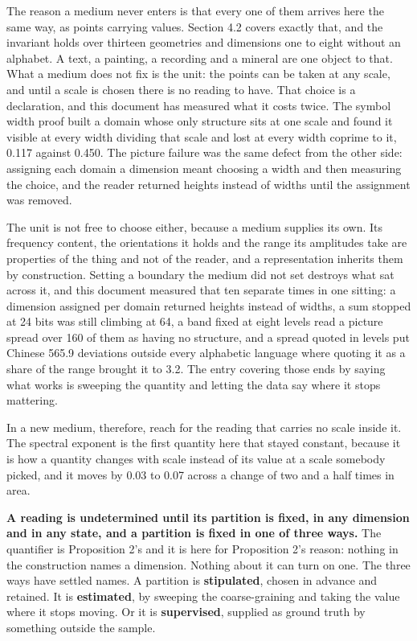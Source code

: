 The reason a medium never enters is that every one of them arrives here the same way, as points carrying values. Section 4.2 covers exactly that, and the invariant holds over thirteen geometries and dimensions one to eight without an alphabet. A text, a painting, a recording and a mineral are one object to that. What a medium does not fix is the unit: the points can be taken at any scale, and until a scale is chosen there is no reading to have. That choice is a declaration, and this document has measured what it costs twice. The symbol width proof built a domain whose only structure sits at one scale and found it visible at every width dividing that scale and lost at every width coprime to it, 0.117 against 0.450. The picture failure was the same defect from the other side: assigning each domain a dimension meant choosing a width and then measuring the choice, and the reader returned heights instead of widths until the assignment was removed.

The unit is not free to choose either, because a medium supplies its own. Its frequency content, the orientations it holds and the range its amplitudes take are properties of the thing and not of the reader, and a representation inherits them by construction. Setting a boundary the medium did not set destroys what sat across it, and this document measured that ten separate times in one sitting: a dimension assigned per domain returned heights instead of widths, a sum stopped at 24 bits was still climbing at 64, a band fixed at eight levels read a picture spread over 160 of them as having no structure, and a spread quoted in levels put Chinese 565.9 deviations outside every alphabetic language where quoting it as a share of the range brought it to 3.2. The entry covering those ends by saying what works is sweeping the quantity and letting the data say where it stops mattering.

In a new medium, therefore, reach for the reading that carries no scale inside it. The spectral exponent is the first quantity here that stayed constant, because it is how a quantity changes with scale instead of its value at a scale somebody picked, and it moves by 0.03 to 0.07 across a change of two and a half times in area.

\textbf{A reading is undetermined until its partition is fixed, in any dimension and in any state, and a partition is fixed in one of three ways.} The quantifier is Proposition 2's and it is here for Proposition 2's reason: nothing in the construction names a dimension. Nothing about it can turn on one. The three ways have settled names. A partition is \textbf{stipulated}, chosen in advance and retained. It is \textbf{estimated}, by sweeping the coarse-graining and taking the value where it stops moving. Or it is \textbf{supervised}, supplied as ground truth by something outside the sample.

